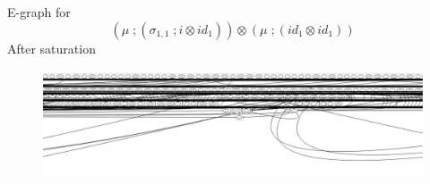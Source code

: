 \documentclass[aspectratio=169]{beamer}
\begin{document}
\begin{frame}
    \small
    \begin{example}
        \vspace{1em}
        E-graph for
        \[
            (\mu\;;(\sigma_{1,1}\;;i \otimes id_{1})) \otimes (\mu\;;(id_{1}\otimes id_{1}))
        \]
        After saturation
        \begin{figure}
            \includegraphics[width=0.9\linewidth]{figures/dot_5.jpeg}
        \end{figure}
        
        \end{example}
\end{frame}








\end{document}

